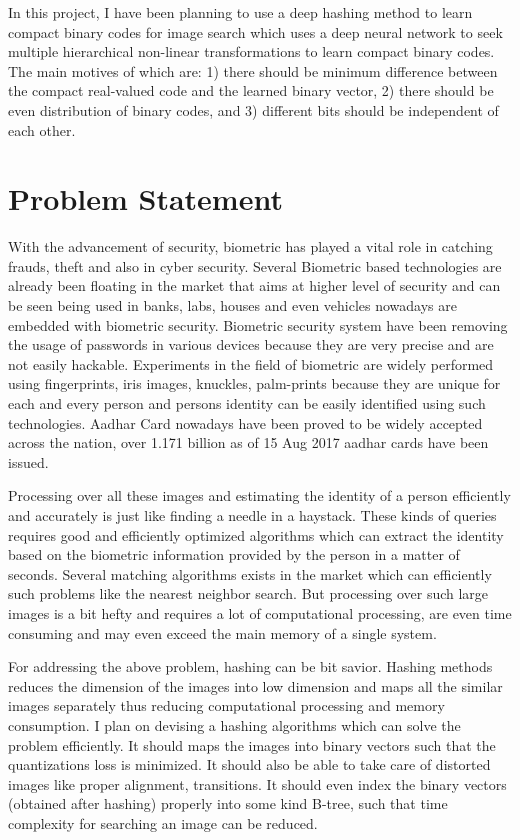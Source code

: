 In this project, I have been planning to use a deep hashing method 
\cite{Li2018DualAD}
to learn compact binary codes for image search which uses a deep neural network to seek multiple hierarchical non-linear transformations to learn compact binary codes. The main motives of which are:
1) there should be minimum difference between the compact real-valued code and the learned binary vector, 2) there should be even distribution of binary codes, and 3) different bits should be independent of each other.

\section{Problem Statement}
	With the advancement of security, biometric has played a vital role in catching frauds, theft and also in cyber security.
	Several Biometric based technologies are already been floating in the market that aims at higher level of security and can be seen being used in banks,
	labs, houses and even vehicles nowadays are embedded with biometric security. Biometric security system have been removing the usage of passwords in various devices because they are very precise and are not easily hackable. Experiments in the field of biometric are widely performed using fingerprints, iris images, knuckles, palm-prints because they are unique for each and every person and persons identity can be easily identified using such technologies.
	Aadhar Card nowadays have been proved to be widely accepted across the nation, over 1.171 billion as of 15 Aug 2017 aadhar cards have been issued.

	Processing over all these images and estimating the identity of a person efficiently and accurately is just like finding a needle in a haystack.
	These kinds of queries requires good and efficiently optimized algorithms which can extract the identity based on the biometric information provided by the person in a matter of seconds. Several matching algorithms exists in the market which can efficiently such problems like the nearest neighbor search.
	But processing over such large images is a bit hefty and requires a lot of computational processing, are even time consuming and may even exceed the main memory of a single system.

	For addressing the above problem, hashing can be bit savior. Hashing methods reduces the dimension of the images into low dimension and maps all the similar
	images separately thus reducing computational processing and memory consumption. I plan on devising a hashing algorithms which can solve the problem efficiently. It should maps the images into binary vectors such that the quantizations loss is minimized. It should also be able to take care of distorted images like proper alignment, transitions. It should even index the binary vectors (obtained after hashing) properly into some kind B-tree, such that time complexity for searching an image can be reduced. 

